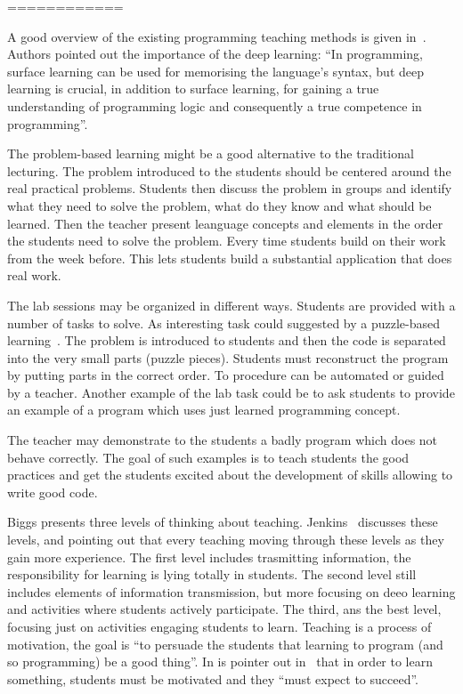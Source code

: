 \documentclass{article}
\begin{document}
============


A good overview of the existing programming teaching methods is given
in~\cite{mohorovivcic2011overview}. Authors pointed out the importance
of the deep learning: ``In programming, surface learning can be used
for memorising the language’s syntax, but deep learning is crucial, in
addition to surface learning, for gaining a true understanding of
programming logic and consequently a true competence in
programming''.

The problem-based learning might be a good alternative to the
traditional lecturing.  The problem introduced to the students should
be centered around the real practical problems. Students then discuss
the problem in groups and identify what they need to solve the
problem, what do they know and what should be learned. Then the
teacher present leanguage concepts and elements in the order the
students need to solve the problem. Every time students build
on their work from the week before. This lets students build a
substantial application that does real work.


The lab sessions may be organized in different ways. Students are
provided with a number of tasks to solve. As interesting task could
suggested by a puzzle-based
learning~\cite{mohorovivcic2011overview}. The problem is introduced to
students and then the code is separated into the very small parts
(puzzle pieces). Students must reconstruct the program by putting
parts in the correct order. To procedure can be automated or guided by
a teacher. Another example of the lab task could be to ask students to
provide an example of a program which uses just learned programming
concept.


The teacher may demonstrate to the students a badly program which does
not behave correctly. The goal of such examples is to teach students
the good practices and get the students excited about the development
of skills allowing to write good code.


Biggs presents three levels of thinking about teaching.
Jenkins~\cite{journey_Jenkins} discusses these levels, and pointing
out that every teaching moving through these levels as they gain more
experience. The first level includes trasmitting information, the
responsibility for learning is lying totally in students.  The second
level still includes elements of information transmission, but more
focusing on deeo learning and activities where students actively
participate.  The third, ans the best level, focusing just on
activities engaging students to learn. Teaching is a process of
motivation, the goal is ``to persuade the students that learning to
program (and so programming) be a good thing''. In is pointer out
in~\cite{journey_Jenkins} that in order to learn something, students
must be motivated and they ``must expect to succeed''.
\end{document}
